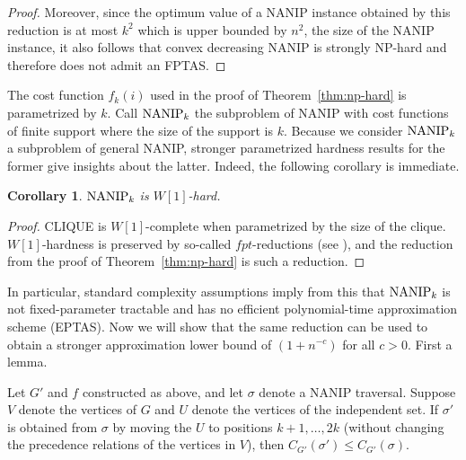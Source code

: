 \documentclass[english]{llncs}
\newtheorem{cor}[thm]{Corollary}
\begin{document}
\begin{proof}
Moreover, since the optimum value of a NANIP instance obtained by this reduction
is at most $k^2$ which is upper bounded by $n^2$, the size of the NANIP instance,
it also follows that convex decreasing NANIP is strongly NP-hard and therefore
does not admit an FPTAS. 

\end{proof}

The cost function $f_k(i)$ used in the proof of Theorem~\ref{thm:np-hard} is
parametrized by $k$.  Call $\textup{NANIP}_k$ the subproblem of NANIP with cost
functions of finite support where the size of the support is $k$. Because we
consider $\textup{NANIP}_k$ a subproblem of general NANIP, stronger
parametrized hardness results for the former give insights about the latter.
Indeed, the following corollary is immediate.

\begin{cor}
$\textup{NANIP}_k$ is $W[1]$-hard.
\end{cor}

\begin{proof} 

CLIQUE is $W[1]$-complete when parametrized by the size of the clique.
$W[1]$-hardness is preserved by so-called $fpt$-reductions (see
\cite{DowneyF13}), and the reduction from the proof of
Theorem~\ref{thm:np-hard} is such a reduction. 

\end{proof}

In particular, standard complexity assumptions imply from this that
$\textup{NANIP}_k$ is not fixed-parameter tractable and has no efficient
polynomial-time approximation scheme (EPTAS). Now we will show that the same
reduction can be used to obtain a stronger approximation lower bound of $(1 +
n^{-c})$ for all $c > 0$. First a lemma.

\begin{lemma}
Let $G'$ and $f$ constructed as above, and let $\sigma$ denote a NANIP
traversal.  Suppose $V$ denote the vertices of $G$ and $U$ denote the vertices
of the independent set.  If $\sigma'$ is obtained from $\sigma$ by moving the
$U$ to positions $k+1,\ldots,2k$ (without changing the precedence relations of the vertices
in $V$), then $C_{G'}(\sigma')\le C_{G'}(\sigma)$.
\end{lemma}
\end{document}
